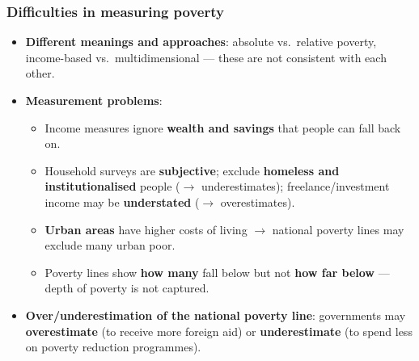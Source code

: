\subsubsection*{Difficulties in measuring poverty}
\begin{itemize}
  \item \textbf{Different meanings and approaches}: absolute vs.\ relative poverty, income-based vs.\ multidimensional --- these are not consistent with each other.
  \item \textbf{Measurement problems}:
  \begin{itemize}
    \item Income measures ignore \textbf{wealth and savings} that people can fall back on.
    \item Household surveys are \textbf{subjective}; exclude \textbf{homeless and institutionalised} people ($\to$ underestimates); freelance/investment income may be \textbf{understated} ($\to$ overestimates).
    \item \textbf{Urban areas} have higher costs of living $\to$ national poverty lines may exclude many urban poor.
    \item Poverty lines show \textbf{how many} fall below but not \textbf{how far below} --- depth of poverty is not captured.
  \end{itemize}
  \item \textbf{Over/underestimation of the national poverty line}: governments may \textbf{overestimate} (to receive more foreign aid) or \textbf{underestimate} (to spend less on poverty reduction programmes).
\end{itemize}
